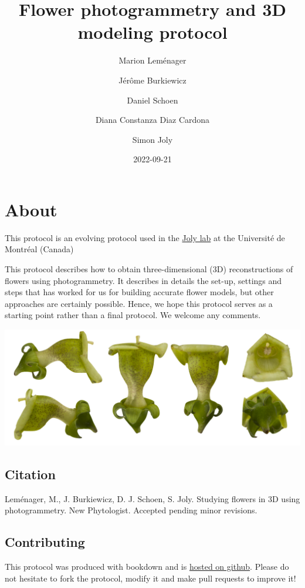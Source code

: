 \documentclass[
]{book}
\title{Flower photogrammetry and 3D modeling protocol}
\author{Marion Leménager \and Jérôme Burkiewicz \and Daniel Schoen \and Diana Constanza Diaz Cardona \and Simon Joly}
\date{2022-09-21}
\begin{document}
\maketitle

{
\setcounter{tocdepth}{1}
\tableofcontents
}
\hypertarget{about}{%
\chapter{About}\label{about}}

This protocol is an evolving protocol used in the \href{www.plantevolution.org}{Joly lab} at the Université de Montréal (Canada)

This protocol describes how to obtain three-dimensional (3D) reconstructions of flowers using photogrammetry. It describes in details the set-up, settings and steps that has worked for us for building accurate flower models, but other approaches are certainly possible. Hence, we hope this protocol serves as a starting point rather than a final protocol. We welcome any comments.

\includegraphics[width=1\textwidth,height=\textheight]{Figures/cover.jpg}

\hypertarget{citation}{%
\section{Citation}\label{citation}}

Leménager, M., J. Burkiewicz, D. J. Schoen, S. Joly. Studying flowers in 3D using photogrammetry. New Phytologist. Accepted pending minor revisions.

\hypertarget{contributing}{%
\section{Contributing}\label{contributing}}

This protocol was produced with bookdown and is \href{https://github.com/plantevolution/photogrammetry-protocol}{hosted on github}. Please do not hesitate to fork the protocol, modify it and make pull requests to improve it!
\end{document}
